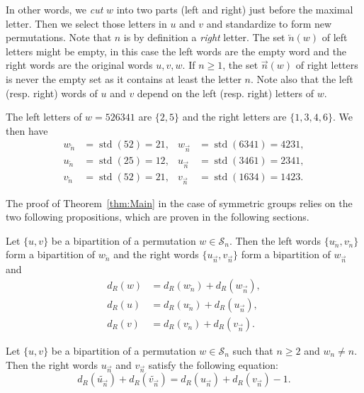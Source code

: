 \documentclass[ALCO,Unicode]{cedram}
\theoremstyle{definition}
\newcommand{\Sym}[1]{\mathcal{S}_{#1}}
\newcommand{\Symn}{\Sym{n}}
\DeclareMathOperator{\std}{std}
\newcommand{\dec}[1]{\widetilde{#1}}
\newcommand{\R}{{\overrightarrow{n}}}
\newcommand{\LL}{{\overleftarrow{n}}}
\newcommand{\dd}{d_R}
\begin{document}
In other words, we \emph{cut} $w$ into two parts (left and right) just before the maximal letter. Then we select those letters in $u$ and $v$ and standardize to form new permutations. Note that $n$ is by definition a \emph{right} letter. The set $\LL(w)$ of left letters might be empty, in this case the left words are the empty word and the right words are the original words $u,v,w$. If $n \geq 1$, the set $\R(w)$ of right letters is never the empty set as it contains at least the letter $n$.  Note also that the left (resp. right) words of $u$ and $v$ depend on the left (resp. right) letters of $w$. 


\begin{ex} The left letters of $w = 526341$ are $\lbrace 2, 5 \rbrace$ and the right letters are $\lbrace 1, 3, 4, 6 \rbrace$. We then have
\begin{align*}
w_\LL &= \std(52) = 21, & w_\R &= \std(6341) = 4231, \\
u_\LL &= \std(25) = 12, & u_\R &= \std(3461) = 2341,  \\
v_\LL &= \std(52) = 21, & v_\R &= \std(1634) = 1423. 
\end{align*}
\end{ex}


The proof of Theorem~\ref{thm:Main} in the case of symmetric groups relies on the two following propositions, which are proven in the following sections.

\begin{prop}
\label{prop:decomposition}
Let $\lbrace u, v \rbrace$ be a bipartition of a permutation $w \in \Symn$. Then the left words $\lbrace u_\LL, v_\LL \rbrace$ form a bipartition of $w_\LL$ and the right words $\lbrace u_\R, v_\R \rbrace$ form a bipartition of $w_\R$ and
\begin{align}
\label{eq:deswdecomp}
\dd(w) &= \dd(w_\LL) + \dd(w_\R), \\
\label{eq:desudecomp}
\dd(u) &= \dd(u_\LL) + \dd(u_\R), \\
\label{eq:desvdecomp}
\dd(v) &= \dd(v_\LL) + \dd(v_\R).
\end{align}
\end{prop}

\begin{prop}
\label{prop:decreasing}
Let $\lbrace u, v \rbrace$ be a bipartition of a permutation $w \in \Symn$ such that $n \geq 2$ and $w_n \neq n$. Then the right words $u_\R$ and $v_\R$ satisfy the following equation:
\begin{equation}
\label{eq:decreasing}
\dd(\dec{u_\R}) + \dd(\dec{v_\R}) = \dd(u_\R) + \dd(v_\R) -1.
\end{equation}
\end{prop}
\end{document}
